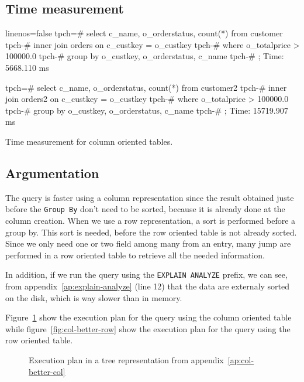 \documentclass[a4paper,11pt]{report}
\begin{document}
\subsection*{Time measurement}

\begin{listing}[H]
\centering
\begin{sqlcode*}{linenos=false}
tpch=# select c_name, o_orderstatus, count(*) from customer
tpch-#     inner join orders on c_custkey = o_custkey
tpch-#     where o_totalprice > 100000.0
tpch-#     group by o_custkey, o_orderstatus, c_name
tpch-#     ;
Time: 5668.110 ms

tpch=# select c_name, o_orderstatus, count(*) from customer2
tpch-#     inner join orders2 on c_custkey = o_custkey
tpch-#     where o_totalprice > 100000.0
tpch-#     group by o_custkey, o_orderstatus, c_name
tpch-#     ;
Time: 15719.907 ms
\end{sqlcode*}
\caption{Time measurement for column oriented tables.}
\label{lst:time-column}
\end{listing}

\subsection*{Argumentation}

The query is faster using a column representation since the result obtained
juste before the \texttt{Group By} don't need to be sorted, because it is
already done at the column creation. When we use a row representation, a sort is
performed before a group by. This sort is needed, before the row oriented table
is not already sorted. Since we only need one or two field among many from
an entry, many jump are performed in a row oriented table to retrieve all the
needed information.

In addition, if we run the query using the \verb+EXPLAIN ANALYZE+ prefix, we can
see, from appendix~\ref{ap:explain-analyze} (line 12) that the data are
externaly sorted on the disk, which is way slower than in memory.

Figure~\ref{fig:col-better-col} show the execution plan for the query using the
column oriented table while figure~\ref{fig:col-better-row} show the execution
plan for the query using the row oriented table.

\begin{figure}[H]
  \centering
  \caption{Execution plan in a tree representation from appendix~\ref{ap:col-better-col}}
  \label{fig:col-better-col} 
\end{figure}
\end{document}
